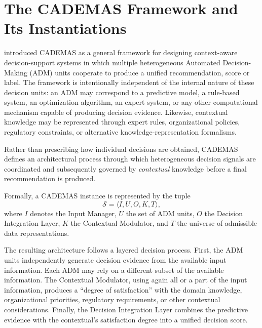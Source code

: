 \documentclass[mathematics,article,submit,moreauthors]{Definitions/mdpi}
\begin{document}
\section{The CADEMAS Framework and Its Instantiations}
\label{sect:cademas} 


\citet{NovoaHernandez2026} introduced CADEMAS as a general framework for designing context-aware decision-support systems in which multiple heterogeneous Automated Decision-Making (ADM) units cooperate to produce a unified recommendation, score or label. The framework is intentionally independent of the internal nature of these decision units: an ADM may correspond to a predictive model, a rule-based system, an optimization algorithm, an expert system, or any other computational mechanism capable of producing decision evidence. 
Likewise, contextual knowledge may be represented through expert rules, organizational policies, regulatory constraints, or alternative knowledge-representation formalisms.

Rather than prescribing how individual decisions are obtained, CADEMAS defines an architectural process through which heterogeneous decision signals are coordinated and subsequently governed by \textit{contextual} knowledge before a final recommendation is produced.

Formally, a CADEMAS instance is represented by the tuple
\begin{equation}
\mathcal{S}=
\langle I, U, O, K, T \rangle,
\end{equation}
where $I$ denotes the Input Manager, $U$ the set of ADM units, $O$ the Decision Integration Layer, $K$ the Contextual Modulator, and $T$ the universe of admissible data representations. %

The resulting architecture follows a layered decision process. First, the ADM units independently generate decision evidence from the available input information. Each ADM may rely on a different subset of the available information. The Contextual Modulator, using again all or a part of the input information, produces a ``degree of satisfaction'' with the domain knowledge, organizational priorities, regulatory requirements, or other contextual considerations. 
Finally, the Decision Integration Layer combines the predictive evidence with the contextual's satisfaction degree into a unified decision score. 
\end{document}
